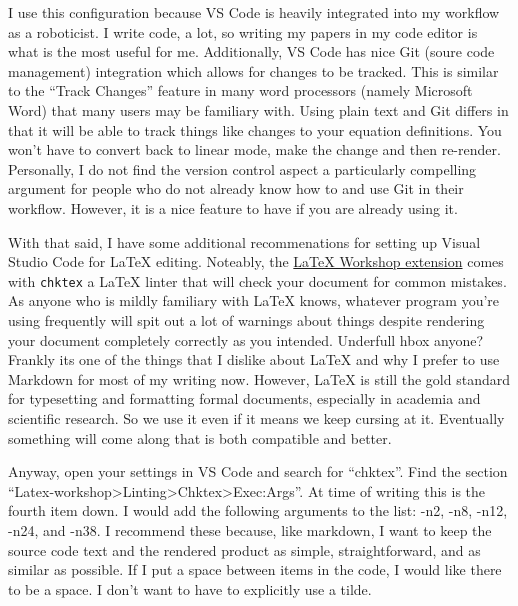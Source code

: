 \documentclass{thesis-dissertation}
\begin{document}
I use this configuration because VS Code is heavily integrated into my workflow as a roboticist. I write code, a lot, so writing my papers in my code editor is what is the most useful for me. Additionally, VS Code has nice Git (soure code management) integration which allows for changes to be tracked. This is similar to the ``Track Changes'' feature in many word processors (namely Microsoft Word) that many users may be familiary with. Using plain text and Git differs in that it will be able to track things like changes to your equation definitions. You won't have to convert back to linear mode, make the change and then re-render. Personally, I do not find the version control aspect a particularly compelling argument for people who do not already know how to and use Git in their workflow. However, it is a nice feature to have if you are already using it.

With that said, I have some additional recommenations for setting up Visual Studio Code for \LaTeX{} editing. Noteably, the \href{https://marketplace.visualstudio.com/items/?itemName=James-Yu.latex-workshop}{LaTeX Workshop extension} comes with \texttt{chktex} a \LaTeX{} linter that will check your document for common mistakes. As anyone who is mildly familiary with \LaTeX{} knows, whatever program you're using frequently will spit out a lot of warnings about things despite rendering your document completely correctly as you intended. Underfull hbox anyone? Frankly its one of the things that I dislike about \LaTeX{} and why I prefer to use Markdown for most of my writing now. However, \LaTeX{} is still the gold standard for typesetting and formatting formal documents, especially in academia and scientific research. So we use it even if it means we keep cursing at it. Eventually something will come along that is both compatible and better.

Anyway, open your settings in VS Code and search for ``chktex''. Find the section ``Latex-workshop>Linting>Chktex>Exec:Args''. At time of writing this is the fourth item down. I would add the following arguments to the list: -n2, -n8, -n12, -n24, and -n38. I recommend these because, like markdown, I want to keep the source code text and the rendered product as simple, straightforward, and as similar as possible. If I put a space between items in the code, I would like there to be a space. I don't want to have to explicitly use a tilde.
\end{document}
